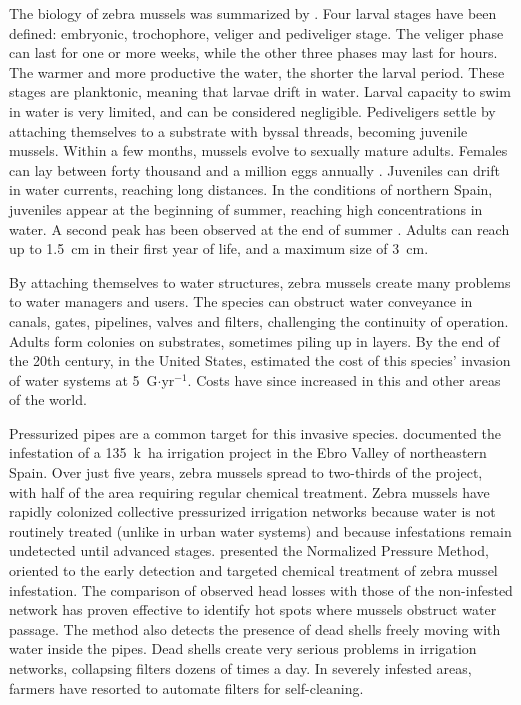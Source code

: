 \documentclass[review,authoryear]{elsarticle}
\begin{document}
The biology of zebra mussels was summarized by \citet{Cohen09}. Four larval
stages have been defined: embryonic, trochophore, veliger and pediveliger stage.
The veliger phase can last for one or more weeks, while the other three phases
may last for hours. The warmer and more productive the water, the shorter the
larval period. These stages are planktonic, meaning that larvae drift in water.
Larval capacity to swim in water is very limited, and can be considered
negligible. Pediveligers settle by attaching themselves to a substrate with
byssal threads, becoming juvenile mussels. Within a few months, mussels evolve
to sexually mature adults. Females can lay between forty thousand and a million
eggs annually \citep{CHE07}. Juveniles can drift in water currents, reaching
long distances. In the conditions of northern Spain, juveniles appear at the
beginning of summer, reaching high concentrations in water. A second peak has
been observed at the end of summer \citep{Araujo06, URA14}. Adults can reach up
to 1.5~cm in their first year of life, and a maximum size of 3~cm.

By attaching themselves to water structures, zebra mussels create many problems
to water managers and users. The species can obstruct water conveyance in
canals, gates, pipelines, valves and filters, challenging the continuity of
operation. Adults form colonies on substrates, sometimes piling up in layers. By
the end of the 20th century, in the United States, \citet{Khalanski97} estimated
the cost of this species’ invasion of water systems at
5~G\textdollar$\cdot$yr$^{-1}$. Costs have since increased in this and other
areas of the world.

Pressurized pipes are a common target for this invasive species.
\citet{MoralesHernandez18} documented the infestation of a 135~k~ha irrigation
project in the Ebro Valley of northeastern Spain. Over just five years, zebra
mussels spread to two-thirds of the project, with half of the area requiring
regular chemical treatment. Zebra mussels have rapidly colonized collective
pressurized irrigation networks because water is not routinely treated (unlike
in urban water systems) and because infestations remain undetected until
advanced stages. \citet{MoralesHernandez18, MoralesHernandez22} presented the
Normalized Pressure Method, oriented to the early detection and targeted
chemical treatment of zebra mussel infestation. The comparison of observed head
losses with those of the non-infested network has proven effective to identify
hot spots where mussels obstruct water passage. The method also detects the
presence of dead shells freely moving with water inside the pipes. Dead shells
create very serious problems in irrigation networks, collapsing filters dozens
of times a day. In severely infested areas, farmers have resorted to automate
filters for self-cleaning.
\end{document}

